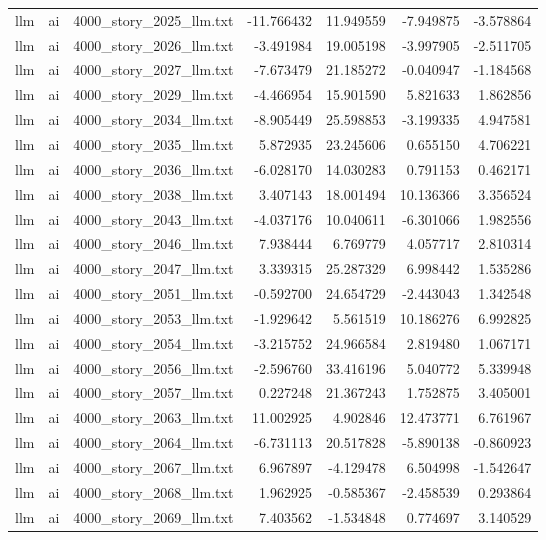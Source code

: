 \begin{longtable}{lllrrrr}
llm & ai & 4000\_story\_2025\_llm.txt & -11.766432 & 11.949559 & -7.949875 & -3.578864 \\
llm & ai & 4000\_story\_2026\_llm.txt & -3.491984 & 19.005198 & -3.997905 & -2.511705 \\
llm & ai & 4000\_story\_2027\_llm.txt & -7.673479 & 21.185272 & -0.040947 & -1.184568 \\
llm & ai & 4000\_story\_2029\_llm.txt & -4.466954 & 15.901590 & 5.821633 & 1.862856 \\
llm & ai & 4000\_story\_2034\_llm.txt & -8.905449 & 25.598853 & -3.199335 & 4.947581 \\
llm & ai & 4000\_story\_2035\_llm.txt & 5.872935 & 23.245606 & 0.655150 & 4.706221 \\
llm & ai & 4000\_story\_2036\_llm.txt & -6.028170 & 14.030283 & 0.791153 & 0.462171 \\
llm & ai & 4000\_story\_2038\_llm.txt & 3.407143 & 18.001494 & 10.136366 & 3.356524 \\
llm & ai & 4000\_story\_2043\_llm.txt & -4.037176 & 10.040611 & -6.301066 & 1.982556 \\
llm & ai & 4000\_story\_2046\_llm.txt & 7.938444 & 6.769779 & 4.057717 & 2.810314 \\
llm & ai & 4000\_story\_2047\_llm.txt & 3.339315 & 25.287329 & 6.998442 & 1.535286 \\
llm & ai & 4000\_story\_2051\_llm.txt & -0.592700 & 24.654729 & -2.443043 & 1.342548 \\
llm & ai & 4000\_story\_2053\_llm.txt & -1.929642 & 5.561519 & 10.186276 & 6.992825 \\
llm & ai & 4000\_story\_2054\_llm.txt & -3.215752 & 24.966584 & 2.819480 & 1.067171 \\
llm & ai & 4000\_story\_2056\_llm.txt & -2.596760 & 33.416196 & 5.040772 & 5.339948 \\
llm & ai & 4000\_story\_2057\_llm.txt & 0.227248 & 21.367243 & 1.752875 & 3.405001 \\
llm & ai & 4000\_story\_2063\_llm.txt & 11.002925 & 4.902846 & 12.473771 & 6.761967 \\
llm & ai & 4000\_story\_2064\_llm.txt & -6.731113 & 20.517828 & -5.890138 & -0.860923 \\
llm & ai & 4000\_story\_2067\_llm.txt & 6.967897 & -4.129478 & 6.504998 & -1.542647 \\
llm & ai & 4000\_story\_2068\_llm.txt & 1.962925 & -0.585367 & -2.458539 & 0.293864 \\
llm & ai & 4000\_story\_2069\_llm.txt & 7.403562 & -1.534848 & 0.774697 & 3.140529 \\

\end{longtable}
